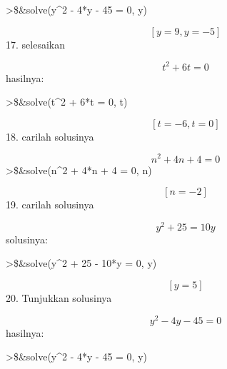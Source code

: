 \documentclass[
]{book}
\begin{document}
\textgreater\$\&solve(y\^{}2 - 4*y - 45 = 0, y)

\[\left[ y=9 , y=-5 \right] \] 17. selesaikan

\[t^2 + 6t = 0\]hasilnya:

\textgreater\$\&solve(t\^{}2 + 6*t = 0, t)

\[\left[ t=-6 , t=0 \right] \]18. carilah solusinya

\[ n^2 + 4n + 4 = 0 \]\textgreater\$\&solve(n\^{}2 + 4*n + 4 = 0, n)

\[\left[ n=-2 \right]\] 19. carilah solusinya

\[y^2 + 25 = 10y\]solusinya:

\textgreater\$\&solve(y\^{}2 + 25 - 10*y = 0, y)

\[\left[ y=5 \right]\] 20. Tunjukkan solusinya

\[y^2-4y-45= 0\]hasilnya:

\textgreater\$\&solve(y\^{}2 - 4*y - 45 = 0, y)

\backmatter
\end{document}
